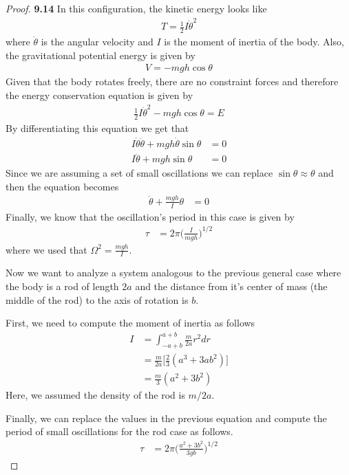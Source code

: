 \documentclass[11pt]{article}
\theoremstyle{definition}
\begin{document}
\begin{proof}{\textbf{9.14}}
        In this configuration, the kinetic energy looks like 
        \begin{align*}
            T = \frac{1}{2}I\dot{\theta}^2
        \end{align*}
        where $\dot{\theta}$ is the angular velocity and $I$ is the moment
        of inertia of the body.
        Also, the gravitational potential energy is given by
        \begin{align*}
            V = - mgh\cos\theta
        \end{align*}
        Given that the body rotates freely, there are no constraint forces
        and therefore the energy conservation equation is given by
        \begin{align*}
            \frac{1}{2}I\dot{\theta}^2 - mgh\cos\theta = E
        \end{align*}
        By differentiating this equation we get that
        \begin{align*}
            I\dot{\theta}\ddot{\theta} + mgh\dot{\theta}\sin\theta &= 0\\
            I\ddot{\theta} + mgh\sin\theta &= 0
        \end{align*}
        Since we are assuming a set of small oscillations we can replace
        $\sin\theta \approx \theta$ and then the equation becomes
        \begin{align*}
            \ddot{\theta} + \frac{mgh}{I}\theta &= 0
        \end{align*}
        Finally, we know that the oscillation's period in this case is given by
        \begin{align*}
            \tau &= 2\pi\bigg(\frac{I}{mgh}\bigg)^{1/2}
        \end{align*}        
        where we used that $\Omega^2 = \frac{mgh}{I}$.
         
        Now we want to analyze a system analogous to the previous general case
        where the body is a rod of length $2a$ and the distance from it's
        center of mass (the middle of the rod) to the axis of rotation is $b$.

        First, we need to compute the moment of inertia as follows
        \begin{align*}
            I &= \int_{-a+b}^{a+b} \frac{m}{2a}r^2 dr\\
            &= \frac{m}{2a}\bigg[\frac{2}{3}(a^3 + 3ab^2)\bigg]\\
            &= \frac{m}{3}(a^2 + 3b^2)
        \end{align*}        
        Here, we assumed the density of the rod is $m/2a$.

        Finally, we can replace the values in the previous equation and compute
        the period of small oscillations for the rod case as follows.
        \begin{align*}
            \tau &= 2\pi\bigg(\frac{a^2+3b^2}{3gb}\bigg)^{1/2}
        \end{align*}        
 
    \end{proof}
\end{document}

